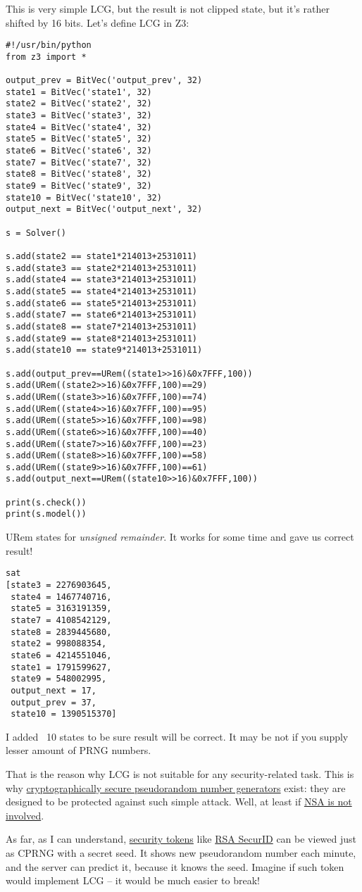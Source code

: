This is very simple LCG, but the result is not clipped state, but it's rather shifted by 16 bits.
Let's define LCG in Z3:

\begin{lstlisting}
#!/usr/bin/python
from z3 import *

output_prev = BitVec('output_prev', 32)
state1 = BitVec('state1', 32)
state2 = BitVec('state2', 32)
state3 = BitVec('state3', 32)
state4 = BitVec('state4', 32)
state5 = BitVec('state5', 32)
state6 = BitVec('state6', 32)
state7 = BitVec('state7', 32)
state8 = BitVec('state8', 32)
state9 = BitVec('state9', 32)
state10 = BitVec('state10', 32)
output_next = BitVec('output_next', 32)

s = Solver()

s.add(state2 == state1*214013+2531011)
s.add(state3 == state2*214013+2531011)
s.add(state4 == state3*214013+2531011)
s.add(state5 == state4*214013+2531011)
s.add(state6 == state5*214013+2531011)
s.add(state7 == state6*214013+2531011)
s.add(state8 == state7*214013+2531011)
s.add(state9 == state8*214013+2531011)
s.add(state10 == state9*214013+2531011)

s.add(output_prev==URem((state1>>16)&0x7FFF,100))
s.add(URem((state2>>16)&0x7FFF,100)==29)
s.add(URem((state3>>16)&0x7FFF,100)==74)
s.add(URem((state4>>16)&0x7FFF,100)==95)
s.add(URem((state5>>16)&0x7FFF,100)==98)
s.add(URem((state6>>16)&0x7FFF,100)==40)
s.add(URem((state7>>16)&0x7FFF,100)==23)
s.add(URem((state8>>16)&0x7FFF,100)==58)
s.add(URem((state9>>16)&0x7FFF,100)==61)
s.add(output_next==URem((state10>>16)&0x7FFF,100))

print(s.check())
print(s.model())
\end{lstlisting}

URem states for \textit{unsigned remainder}.
It works for some time and gave us correct result!

\begin{lstlisting}
sat
[state3 = 2276903645,
 state4 = 1467740716,
 state5 = 3163191359,
 state7 = 4108542129,
 state8 = 2839445680,
 state2 = 998088354,
 state6 = 4214551046,
 state1 = 1791599627,
 state9 = 548002995,
 output_next = 17,
 output_prev = 37,
 state10 = 1390515370]
\end{lstlisting}

I added ~10 states to be sure result will be correct. It may be not if you supply lesser amount of PRNG numbers.

That is the reason why LCG is not suitable for any security-related task.
This is why \href{https://en.wikipedia.org/wiki/Cryptographically_secure_pseudorandom_number_generator}{cryptographically secure pseudorandom number generators} exist: they are designed to be protected against such simple attack.
Well, at least if \href{https://en.wikipedia.org/wiki/Dual_EC_DRBG}{NSA is not involved}.

As far, as I can understand, \href{http://en.wikipedia.org/wiki/Security_token}{security tokens} like \href{http://en.wikipedia.org/wiki/RSA_SecurID}{RSA SecurID} can be viewed just as \ac{CPRNG} with a secret seed.
It shows new pseudorandom number each minute, and the server can predict it, because it knows the seed.
Imagine if such token would implement LCG -- it would be much easier to break!


